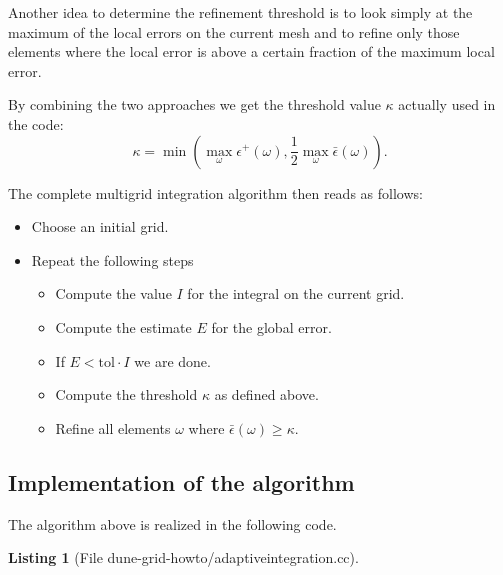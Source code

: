 \documentclass[11pt,a4paper,headinclude,footinclude,DIV16,headings=normal]{scrreprt}
\newtheorem{lst}{Listing}
\begin{document}
Another idea to determine the refinement threshold is to look simply
at the maximum of the local errors on the current mesh and
to refine only those elements where the local error is above a certain
fraction of the maximum local error.

By combining the two approaches we get the threshold value $\kappa$
actually used in the code:
\begin{equation}
\kappa = \min\left(\max\limits_{\omega} \epsilon^+(\omega), \frac12
  \max\limits_{\omega} \bar{\epsilon}(\omega) \right).
\end{equation}


The complete multigrid integration algorithm then reads as follows:
\begin{itemize}
\item Choose an initial grid.
\item Repeat the following steps
\begin{itemize}
\item Compute the value $I$ for the integral on the current grid.
\item Compute the estimate $E$ for the global error.
\item If $E<\text{tol}\cdot I$ we are done.
\item Compute the threshold $\kappa$ as defined above.
\item Refine all elements $\omega$ where $\bar{\epsilon}(\omega)\geq\kappa$.
\end{itemize}
\end{itemize}

\subsection{Implementation of the algorithm}

The algorithm above is realized in the following code.

\begin{lst}[File dune-grid-howto/adaptiveintegration.cc] \mbox{}
\nopagebreak

\end{lst}
\end{document}
